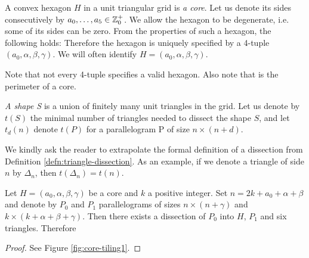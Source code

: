 \begin{defn}
A convex hexagon $H$ in a unit triangular grid is \emph{a core}. Let us denote its sides consecutively by $a_0,\dots,a_5 \in \mathbb Z_0^+$. We allow the hexagon to be degenerate, i.e. some of its sides can be zero. From the properties of such a hexagon, the following holds:
Therefore the hexagon is uniquely specified by a 4-tuple $(a_0, \alpha, \beta, \gamma)$. We will often identify $H = (a_0, \alpha, \beta, \gamma)$.
\end{defn}

Note that not every 4-tuple specifies a valid hexagon. Also note that
is the perimeter of a core.

\begin{defn}
\emph{A shape S} is a union of finitely many unit triangles in the grid. Let us denote by $t(S)$ the minimal number of triangles needed to dissect the shape $S$, and let $t_d(n)$ denote $t(P)$ for a parallelogram P of size $n \times (n+d)$.
\end{defn}

We kindly ask the reader to extrapolate the formal definition of a dissection from Definition \ref{defn:triangle-dissection}. As an example, if we denote a triangle of side $n$ by $\Delta_n$, then $t(\Delta_n) = t(n)$.

\begin{lem}
\label{lem:core-tiling}
Let $H = (a_0, \alpha, \beta, \gamma)$ be a core and $k$ a positive integer. Set $n = 2k+a_0+\alpha+\beta$ and denote by $P_0$ and $P_1$ parallelograms of sizes $n\times(n+\gamma)$ and $k\times(k+\alpha+\beta+\gamma)$. Then there exists a dissection of $P_0$ into $H$, $P_1$ and six triangles. Therefore
\end{lem}
\begin{proof}
See Figure \ref{fig:core-tiling1}.
\end{proof}

